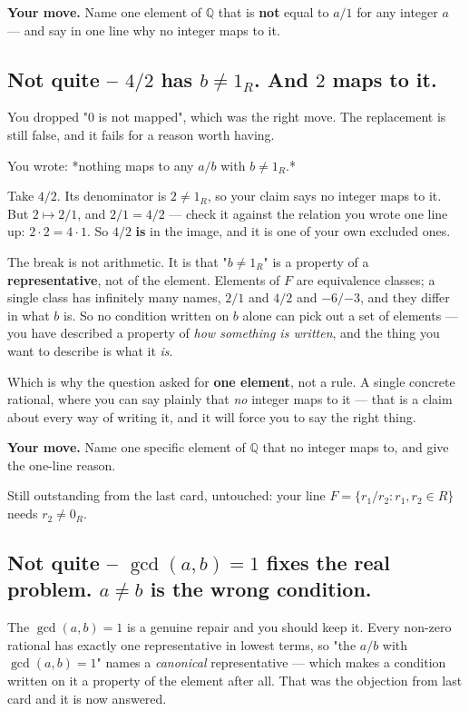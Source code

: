 \documentclass[11pt]{article}
\begin{document}
\textbf{Your move.} Name one element of $\mathbb{Q}$ that is \textbf{not} equal to $a/1$ for any integer $a$ --- and say in one line why no integer maps to it.


\subsection*{Not quite -- $4/2$ has $b \neq 1_R$. And $2$ maps to it.}
You dropped "$0$ is not mapped", which was the right move. The replacement is still false, and it fails for a reason worth having.

You wrote: *nothing maps to any $a/b$ with $b \neq 1_R$.*

Take $4/2$. Its denominator is $2 \neq 1_R$, so your claim says no integer maps to it. But $2 \mapsto 2/1$, and $2/1 = 4/2$ --- check it against the relation you wrote one line up: $2 \cdot 2 = 4 \cdot 1$. So $4/2$ \textbf{is} in the image, and it is one of your own excluded ones.

The break is not arithmetic. It is that "$b \neq 1_R$" is a property of a \textbf{representative}, not of the element. Elements of $F$ are equivalence classes; a single class has infinitely many names, $2/1$ and $4/2$ and $-6/{-3}$, and they differ in what $b$ is. So no condition written on $b$ alone can pick out a set of elements --- you have described a property of \emph{how something is written}, and the thing you want to describe is what it \emph{is}.

Which is why the question asked for \textbf{one element}, not a rule. A single concrete rational, where you can say plainly that \emph{no} integer maps to it --- that is a claim about every way of writing it, and it will force you to say the right thing.

\textbf{Your move.} Name one specific element of $\mathbb{Q}$ that no integer maps to, and give the one-line reason.

Still outstanding from the last card, untouched: your line $F = \{r_1/r_2 : r_1, r_2 \in R\}$ needs $r_2 \neq 0_R$.


\subsection*{Not quite -- $\gcd(a,b)=1$ fixes the real problem. $a \neq b$ is the wrong condition.}
The $\gcd(a,b) = 1$ is a genuine repair and you should keep it. Every non-zero rational has exactly one representative in lowest terms, so "the $a/b$ with $\gcd(a,b)=1$" names a \emph{canonical} representative --- which makes a condition written on it a property of the element after all. That was the objection from last card and it is now answered.
\end{document}
